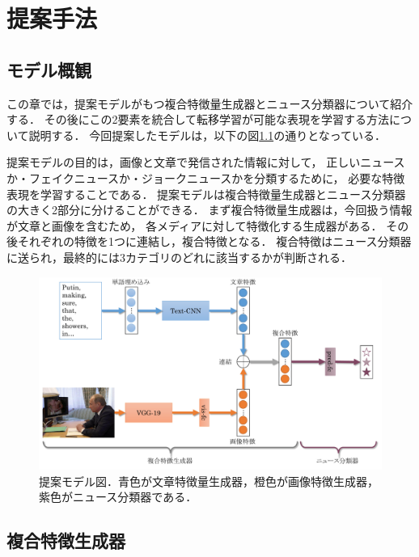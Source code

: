 %
\chapter{提案手法}
%
\section{モデル概観}
この章では，提案モデルがもつ複合特徴量生成器とニュース分類器について紹介する．
その後にこの2要素を統合して転移学習が可能な表現を学習する方法について説明する．
今回提案したモデルは，以下の図\ref{fig:model}の通りとなっている．

提案モデルの目的は，画像と文章で発信された情報に対して，
正しいニュースか・フェイクニュースか・ジョークニュースかを分類するために，
必要な特徴表現を学習することである．
提案モデルは複合特徴量生成器とニュース分類器の大きく2部分に分けることができる．
まず複合特徴量生成器は，今回扱う情報が文章と画像を含むため，
各メディアに対して特徴化する生成器がある．
その後それぞれの特徴を1つに連結し，複合特徴となる．
複合特徴はニュース分類器に送られ，最終的には3カテゴリのどれに該当するかが判断される．
% 
\begin{figure}[H]
    \centering
    \includegraphics[width=\linewidth]{images/methodology.pdf}
    \caption{提案モデル図．青色が文章特徴量生成器，橙色が画像特徴生成器，紫色がニュース分類器である．}
    \label{fig:model}
\end{figure}
%
\section{複合特徴生成器}
%
